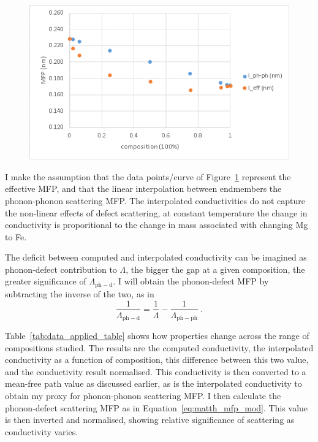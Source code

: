 \begin{figure}[h!]
  \includegraphics[width=\linewidth]{Figures/kc_4000_mfp_norm.png}
  \caption[kc 4000 mfp norm]{}
  \label{kc_4000_mfp_norm}
\end{figure}

I make the assumption that the data points/curve of Figure~\ref{kc_4000_mfp_norm} represent the effective MFP, and that the linear interpolation between endmembers the phonon-phonon scattering MFP. The interpolated conductivities do not capture the non-linear effects of defect scattering, at constant temperature the change in conductivity is proporitional to the change in mass associated with changing Mg to Fe.

The deficit between computed and interpolated conductivity can be imagined as phonon-defect contribution to $\Lambda$, the bigger the gap at a given composition, the greater significance of $\Lambda_{\mathrm{ph-d}}$. I will obtain the phonon-defect MFP by subtracting the inverse of the two, as in 
%
\begin{equation}
\frac{1}{\Lambda_{\mathrm{ph-d}}}=\frac{1}{\Lambda}-\frac{1}{\Lambda_{\mathrm{ph-ph}}}\ .
\label{eq:matth_mfp_mod2}
\end{equation}

Table~\ref{tab:data_applied_table} shows how properties change across the range of compositions studied. The results are the computed conductivity, the interpolated conductivity as a function of composition, this difference between this two value, and the conductivity result normalised. This conductivity is then converted to a mean-free path value as discussed earlier, as is the interpolated conductivity to obtain my proxy for phonon-phonon scattering MFP. I then calculate the phonon-defect scattering MFP as in Equation~\ref{eq:matth_mfp_mod}. This value is then inverted and normalised, showing relative significance of scattering as conductivity varies.




